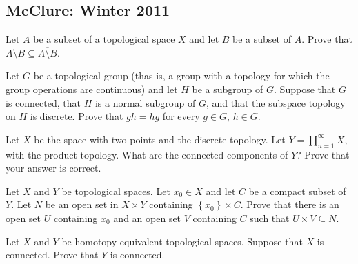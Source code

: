 \subsection{McClure: Winter 2011}
\setcounter{exercise}{0}

\begin{problem}
  Let \(A\) be a subset of a topological space \(X\) and let \(B\) be a
  subset of \(A\). Prove that
  \(\bar A\setminus\bar B\subseteq\overline{A\setminus B}\).
\end{problem}
\begin{solution}
\end{solution}

\begin{problem}
  Let \(G\) be a topological group (thas is, a group with a topology for
  which the group operations are continuous) and let \(H\) be a subgroup of
  \(G\). Suppose that \(G\) is connected, that \(H\) is a normal subgroup
  of \(G\), and that the subspace topology on \(H\) is discrete. Prove that
  \(g h=hg\) for every \(g\in G\), \(h\in G\).
\end{problem}
\begin{solution}
\end{solution}

\begin{problem}
  Let \(X\) be the space with two points and the discrete topology. Let
  \(Y=\prod_{n=1}^\infty X\), with the product topology. What are the
  connected components of \(Y\)? Prove that your answer is correct.
\end{problem}
\begin{solution}
\end{solution}

\begin{problem}
  Let \(X\) and \(Y\) be topological spaces. Let \(x_0\in X\) and let \(C\)
  be a compact subset of \(Y\). Let \(N\) be an open set in \(X\times Y\)
  containing \(\left\{x_0\right\}\times C\). Prove that there is an open
  set \(U\) containing \(x_0\) and an open set \(V\) containing \(C\) such
  that \(U\times V\subseteq N\).
\end{problem}
\begin{solution}
\end{solution}

\begin{problem}
  Let \(X\) and \(Y\) be homotopy-equivalent topological spaces. Suppose
  that \(X\) is connected. Prove that \(Y\) is connected.
\end{problem}
\begin{solution}
\end{solution}

